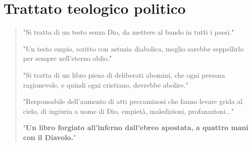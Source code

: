 \chapter{Trattato teologico politico}

\bigskip
\bigskip
\begin{quotation}
	\small "Si tratta di un testo senza Dio, da mettere al bando in tutti i paesi."
	
	"Un testo empio, scritto con astuzia diabolica, meglio sarebbe seppellirlo per sempre nell'eterno oblio."
	
	"Si tratta di un libro pieno di deliberati abomini, che ogni persona ragionevole, e quindi ogni cristiano, dovrebbe abolire."
	
	"Responsabile dell'aumento di atti peccaminosi che fanno levare grida al cielo, di ingiuria a nome di Dio, empietà, maledizioni, profanazioni..."
	
	"\textbf{Un libro forgiato all'inferno dall'ebreo apostata, a quattro mani con il Diavolo.}"
	
	
\end{quotation}


\newpage